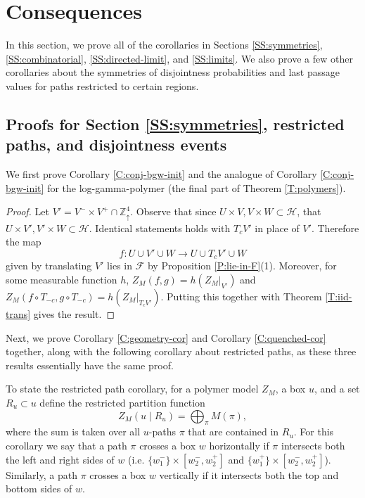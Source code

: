 \documentclass[aop, preprint]{imsart}
\theoremstyle{plain}
\theoremstyle{definition}
\theoremstyle{plain}
\newcommand{\sset}{\subset}
\newcommand{\Zd}{\mathds{Z}^4_\uparrow}
\newcommand{\scrH}{\mathcal{H}}
\newcommand{\scrF}{\mathcal{F}}
\newcommand{\X}{\times}
\begin{document}
\section{Consequences}
\label{SS:consequences}

In this section, we prove all of the corollaries in Sections \ref{SS:symmetries}, \ref{SS:combinatorial}, \ref{SS:directed-limit}, and \ref{SS:limits}. We also prove a few other corollaries about the symmetries of disjointness probabilities and last passage values for paths restricted to certain regions.

\subsection{Proofs for Section \ref{SS:symmetries}, restricted paths, and disjointness events}
\label{SS:sym-proof} 

We first prove Corollary \ref{C:conj-bgw-init} and the analogue of Corollary \ref{C:conj-bgw-init} for the log-gamma-polymer (the final part of Theorem \ref{T:polymers}).
\begin{proof}
	Let $V' = V^- \X V^+ \cap \Zd$.
	Observe that since $U \X V, V \X W \sset \scrH$, that 
	$
	U \X V', V' \X W \sset \scrH.
	$
	Identical statements holds with $T_c V'$ in place of $V'$. Therefore the map 
	$$
	f:U \cup V' \cup W \to U \cup T_cV' \cup W
	$$
	given by translating $V'$ lies in $\scrF$ by Proposition \ref{P:lie-in-F}(1). Moreover, for some measurable function $h$, $Z_M(f, g) = h(Z_M|_{V'})$ and $Z_M(f \circ T_{-c}, g \circ T_{-c}) = h(Z_M|_{T_c V'})$. Putting this together with Theorem \ref{T:iid-trans} gives the result.
\end{proof}

Next, we prove Corollary \ref{C:geometry-cor} and Corollary \ref{C:quenched-cor} together, along with the following corollary about restricted paths, as these three results essentially have the same proof.

 To state the restricted path corollary, for a polymer model $Z_M$, a box $u$, and a set $R_u \sset u$ define the restricted partition function
$$
Z_M(u \; | \; R_u) = \bigoplus_\pi M(\pi),
$$
where the sum is taken over all $u$-paths $\pi$ that are contained in $R_u$. For this corollary we say that a path $\pi$ crosses a box $w$ horizontally if $\pi$ intersects both the left and right sides of $w$ (i.e. $\{w^-_1\} \X [w^-_2, w^+_2]$ and $\{w^+_1\} \X [w^-_2, w^+_2]$).  Similarly, a path $\pi$ crosses a box $w$ vertically if it intersects both the top and bottom sides of $w$.
\end{document}
